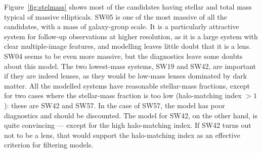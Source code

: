 Figure~\ref{fig:stelmass} shows most of the candidates having stellar
and total mass typical of massive ellipticals.  SW05 is one of the
most massive of all the candidates, with a mass of galaxy-group scale.
It is a particularly attractive system for follow-up observations at
higher resolution, as it is a large system with clear multiple-image
features, and modelling leaves little doubt that it is a lens.  SW04
seems to be even more massive, but the diagnostics leave some doubts
about this model.  The two lowest-mass systems, SW19 and SW42, are
important if they are indeed lenses, as they would be low-mass lenses
dominated by dark matter.  All the modelled systems have reasonable
stellar-mass fractions, except for two cases where the stellar-mass
fraction is too low (halo-matching index $>1$): these are SW42 and
SW57.  In the case of SW57, the model has poor diagnostics and should
be discounted.  The model for SW42, on the other hand, is quite
convincing --- except for the high halo-matching index.  If SW42 turns
out not to be a lens, that would support the halo-matching index as an
effective criterion for filtering models.

